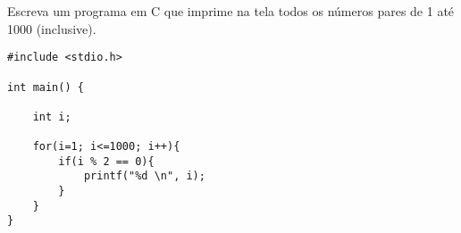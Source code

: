 
\question[10]

Escreva um programa em C que imprime na tela todos os números pares de 1 até 1000 (inclusive).

\begin{solution}
\begin{lstlisting}
#include <stdio.h>

int main() {

	int i;
	
	for(i=1; i<=1000; i++){
		if(i % 2 == 0){
			printf("%d \n", i);
		}
	}
}
\end{lstlisting}
\end{solution}